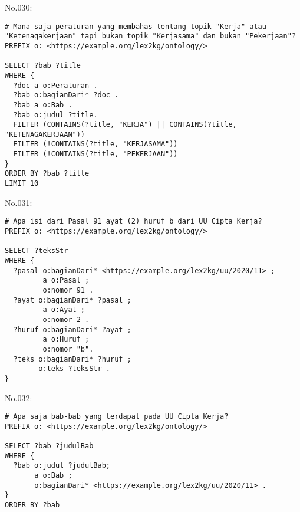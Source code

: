 \noindent No.030:
\begin{lstlisting}
# Mana saja peraturan yang membahas tentang topik "Kerja" atau "Ketenagakerjaan" tapi bukan topik "Kerjasama" dan bukan "Pekerjaan"?
PREFIX o: <https://example.org/lex2kg/ontology/>

SELECT ?bab ?title
WHERE {
  ?doc a o:Peraturan .
  ?bab o:bagianDari* ?doc .
  ?bab a o:Bab .
  ?bab o:judul ?title.
  FILTER (CONTAINS(?title, "KERJA") || CONTAINS(?title, "KETENAGAKERJAAN"))
  FILTER (!CONTAINS(?title, "KERJASAMA"))
  FILTER (!CONTAINS(?title, "PEKERJAAN"))
}
ORDER BY ?bab ?title
LIMIT 10
\end{lstlisting}


\noindent No.031:
\begin{lstlisting}
# Apa isi dari Pasal 91 ayat (2) huruf b dari UU Cipta Kerja?
PREFIX o: <https://example.org/lex2kg/ontology/>

SELECT ?teksStr
WHERE {
  ?pasal o:bagianDari* <https://example.org/lex2kg/uu/2020/11> ;
         a o:Pasal ;
         o:nomor 91 .
  ?ayat o:bagianDari* ?pasal ;
         a o:Ayat ;
         o:nomor 2 .
  ?huruf o:bagianDari* ?ayat ;
         a o:Huruf ;
         o:nomor "b".
  ?teks o:bagianDari* ?huruf ;
        o:teks ?teksStr .
}
\end{lstlisting}


\noindent No.032:
\begin{lstlisting}
# Apa saja bab-bab yang terdapat pada UU Cipta Kerja?
PREFIX o: <https://example.org/lex2kg/ontology/>

SELECT ?bab ?judulBab
WHERE {
  ?bab o:judul ?judulBab;
       a o:Bab ;
       o:bagianDari* <https://example.org/lex2kg/uu/2020/11> .
}
ORDER BY ?bab
\end{lstlisting}

